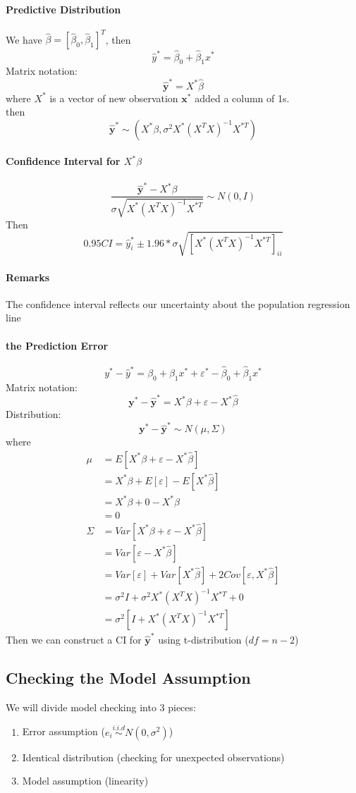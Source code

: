 \documentclass[11pt]{article}
\newcommand{\tb}[1]{\textbf{#1}}
\newcommand{\vx}[0]{\tb{x}}
\newcommand{\vy}[0]{\tb{y}}
\begin{document}
\paragraph{Predictive Distribution}
We have $\hat{\beta} = [\hat{\beta}_0, \hat{\beta}_1]^T$, then
$$\hat{y}^* = \hat{\beta}_0 + \hat{\beta}_1x^*$$
Matrix notation:
$$\hat{\vy}^* = X^*\hat{\beta}$$
where $X^*$ is a vector of new observation $\vx^*$ added a column of 1s. \\
then
$$\hat{\vy}^* \sim (X^*\beta, \sigma^2X^*(X^TX)^{-1}X^{*T})$$
\paragraph{Confidence Interval for $X^*\beta$}
$$\frac{\hat{\vy}^*-X^*\beta}{\sigma\sqrt{X^*(X^TX)^{-1}X^{*T}}} \sim N(0,I)$$
Then $$0.95 CI = \hat{y}^*_i \pm 1.96 * \sigma \sqrt{[X^*(X^TX)^{-1}X^{*T}]_{ii}}$$
\paragraph{Remarks}
The confidence interval reflects our uncertainty about the population regression line
\paragraph{the Prediction Error}
$$y^* - \hat{y}^* = \beta_0 + \beta_1x^* + \varepsilon^* - \hat{\beta}_0 + \hat{\beta}_1x^*$$
Matrix notation:
$$\vy^* - \hat{\vy}^* = X^*\beta + \varepsilon - X^*\hat{\beta}$$
Distribution:
$$\vy^* - \hat{\vy}^* \sim N(\mu, \Sigma)$$ where
\begin{align*}
    \mu &= E[X^*\beta + \varepsilon - X^*\hat{\beta}]\\
    &= X^*\beta + E[\varepsilon] - E[X^*\hat{\beta}]\\
    &= X^*\beta + 0 - X^*\beta \\
    &= 0 \\
    \Sigma &= Var[X^*\beta + \varepsilon - X^*\hat{\beta}] \\
    &= Var[\varepsilon - X^*\hat{\beta}]\\
    &= Var[\varepsilon] + Var[X^*\hat{\beta}] + 2Cov[\varepsilon, X^*\hat{\beta}] \\
    &= \sigma^2I + \sigma^2X^*(X^TX)^{-1}X^{*T} + 0\\
    &= \sigma^2[I + X^*(X^TX)^{-1}X^{*T}]
\end{align*}
Then we can construct a CI for $\hat{\vy}^*$ using t-distribution ($df = n-2$)
\subsection{Checking the Model Assumption}
We will divide model checking into 3 pieces:
\begin{enumerate}
    \item Error assumption ($e_i \overset{i.i.d}{\sim} N(0,  \sigma^2)$)
    \item Identical distribution (checking for unexpected observations)
    \item Model assumption (linearity)
\end{enumerate}
\end{document}
